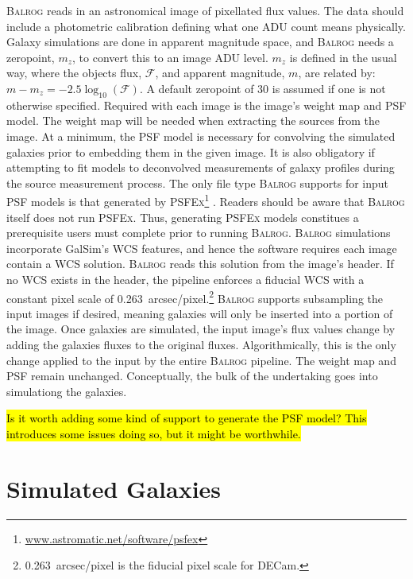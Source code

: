 \documentclass[12pt]{book}
\newcommand{\galsim}{GalSim}
\newcommand{\balrog}{\textsc{Balrog}}
\newcommand{\psfex}{\textsc{PSFEx}}
\begin{document}
\balrog{} reads in an astronomical image of pixellated flux values.
The data should include a photometric calibration defining
what one ADU count means physically. 
Galaxy simulations are done in apparent magnitude space,
and \balrog{} needs a zeropoint, $m_z$, to convert this to an image ADU level.
$m_z$ is defined in the usual way, where the objects flux, $\mathcal{F}$,
and apparent magnitude, $m$, are related by:
$m - m_ z = -2.5 \log_{10}(\mathcal{F})$.
A default zeropoint of 30 is assumed if one is not otherwise specified.
Required with each image is the image's weight map and PSF model. 
The weight map will be needed when extracting the sources from the image.
At a minimum, the PSF model is necessary for convolving the simulated galaxies
prior to  embedding them in the given image.
It is also obligatory if attempting to fit models to deconvolved measurements of galaxy profiles
during the source measurement process.
The only file type \balrog{} supports for input PSF models is that generated by 
\psfex{}\footnote{\url{www.astromatic.net/software/psfex}} \citep{psfex}.
Readers should be aware that \balrog{} itself does not run \psfex{}.
Thus, generating \psfex{} models constitues a prerequisite users must complete prior to running \balrog{}.
\balrog{} simulations incorporate \galsim{}'s WCS features, and hence
the software requires each image contain a WCS solution. \balrog{} reads this solution from the image's header.
If no WCS exists in the header, the pipeline enforces a fiducial WCS with a constant pixel scale of 
0.263~arcsec/pixel.\footnote{0.263~arcsec/pixel is the fiducial pixel scale for DECam.}
\balrog{} supports subsampling the input images if desired, meaning galaxies will only be
inserted into a portion of the image.
Once galaxies are simulated, the input image's flux values change by adding the galaxies fluxes to the original fluxes. 
Algorithmically, this is the only change applied to the input by the entire \balrog{} pipeline.
The weight map and PSF remain unchanged.
Conceptually, the bulk of the undertaking goes into simulationg the galaxies.

\hl{Is it worth adding some kind of support to generate the PSF model? This introduces some issues doing so, but it might be worthwhile.}

\section{Simulated Galaxies}
\label{sec:galsim}
\end{document}
